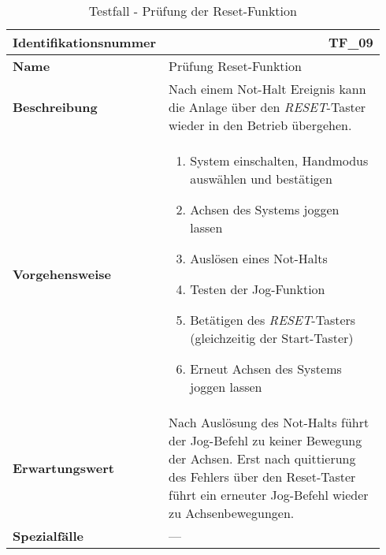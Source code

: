 \documentclass[../../../Bachelorarbeit.tex]{subfiles}
\begin{document}
\begin{table}[H]
    \centering
    \begin{tabular}{ p{0.34\linewidth}  p{0.6\linewidth} }
        \hline
        \textbf{Identifikationsnummer}  & \multicolumn{1}{r}{TF\_09} \\ \hline
        \textbf{Name}                   & Prüfung Reset-Funktion \\
        \textbf{Beschreibung}           & Nach einem Not-Halt Ereignis kann die Anlage über den \textit{RESET}-Taster wieder in den Betrieb übergehen. \\
        \textbf{Vorgehensweise}         &   {\begin{enumerate}[noitemsep,topsep=0pt,parsep=0pt,partopsep=0pt,leftmargin=*]
                                                \item System einschalten, Handmodus auswählen und bestätigen
                                                \item Achsen des Systems joggen lassen
                                                \item Auslösen eines Not-Halts
                                                \item Testen der Jog-Funktion
                                                \item Betätigen des \textit{RESET}-Tasters (gleichzeitig der Start-Taster)
                                                \item Erneut Achsen des Systems joggen lassen
                                            \end{enumerate}} \\
        \textbf{Erwartungswert}         & Nach Auslösung des Not-Halts führt der Jog-Befehl zu keiner Bewegung der Achsen. Erst nach quittierung des Fehlers über den Reset-Taster führt ein erneuter Jog-Befehl wieder zu Achsenbewegungen. \\
        \textbf{Spezialfälle}           & --- \\ \hline
    \end{tabular}
    \caption[\acs{tf} - Reset-Funktion]{Testfall - Prüfung der Reset-Funktion}
    \label{tab:my-table68}
\end{table}
\end{document}
